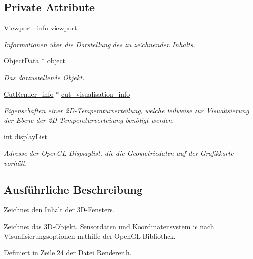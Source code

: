 \subsection*{Private Attribute}
\begin{DoxyCompactItemize}
\item 
\hyperlink{structRenderer_1_1Viewport__info}{Viewport\-\_\-info} \hyperlink{classRenderer_a4428a5ef0ceaf4de5c9991a40990994d}{viewport}
\begin{DoxyCompactList}\small\item\em Informationen über die Darstellung des zu zeichnenden Inhalts. \end{DoxyCompactList}\item 
\hyperlink{classObjectData}{Object\-Data} $\ast$ \hyperlink{classRenderer_a4ad4a42fe6bfd32ff3ef4bb1d59f8f96}{object}
\begin{DoxyCompactList}\small\item\em Das darzustellende Objekt. \end{DoxyCompactList}\item 
\hyperlink{structUtils_1_1CutRender__info}{Cut\-Render\-\_\-info} $\ast$ \hyperlink{classRenderer_a119b7d1e3eb740a118e269758dd1a906}{cut\-\_\-visualisation\-\_\-info}
\begin{DoxyCompactList}\small\item\em Eigenschaften einer 2\-D-\/\-Temperaturverteilung, welche teilweise zur Visualisierung der Ebene der 2\-D-\/\-Temperaturverteilung benötigt werden. \end{DoxyCompactList}\item 
int \hyperlink{classRenderer_a165ec913fa058d0a38f5e7b7635adfd2}{display\-List}
\begin{DoxyCompactList}\small\item\em Adresse der Open\-G\-L-\/\-Displaylist, die die Geometriedaten auf der Grafikkarte vorhält. \end{DoxyCompactList}\end{DoxyCompactItemize}


\subsection{Ausführliche Beschreibung}
Zeichnet den Inhalt der 3\-D-\/\-Fensters. 

Zeichnet das 3\-D-\/\-Objekt, Sensordaten und Koordinatensystem je nach Visualisierungsoptionen mithilfe der Open\-G\-L-\/\-Bibliothek. 

Definiert in Zeile 24 der Datei Renderer.\-h.



